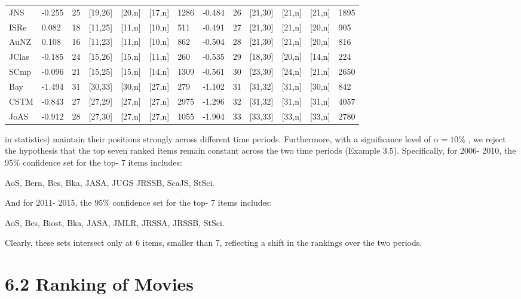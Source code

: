 \begin{longtable}[]{@{}lllllllllllll@{}}
JNS & -0.255 & 25 & {[}19,26{]} & {[}20,n{]} & {[}17,n{]} & 1286 &
-0.484 & 26 & {[}21,30{]} & {[}21,n{]} & {[}21,n{]} & 1895 \\
ISRe & 0.082 & 18 & {[}11,25{]} & {[}11,n{]} & {[}10,n{]} & 511 & -0.491
& 27 & {[}21,30{]} & {[}21,n{]} & {[}20,n{]} & 905 \\
AuNZ & 0.108 & 16 & {[}11,23{]} & {[}11,n{]} & {[}10,n{]} & 862 & -0.504
& 28 & {[}21,30{]} & {[}21,n{]} & {[}20,n{]} & 816 \\
JClas & -0.185 & 24 & {[}15,26{]} & {[}15,n{]} & {[}11,n{]} & 260 &
-0.535 & 29 & {[}18,30{]} & {[}20,n{]} & {[}14,n{]} & 224 \\
SCmp & -0.096 & 21 & {[}15,25{]} & {[}15,n{]} & {[}14,n{]} & 1309 &
-0.561 & 30 & {[}23,30{]} & {[}24,n{]} & {[}21,n{]} & 2650 \\
Bay & -1.494 & 31 & {[}30,33{]} & {[}30,n{]} & {[}27,n{]} & 279 & -1.102
& 31 & {[}31,32{]} & {[}31,n{]} & {[}30,n{]} & 842 \\
CSTM & -0.843 & 27 & {[}27,29{]} & {[}27,n{]} & {[}27,n{]} & 2975 &
-1.296 & 32 & {[}31,32{]} & {[}31,n{]} & {[}31,n{]} & 4057 \\
JoAS & -0.912 & 28 & {[}27,30{]} & {[}27,n{]} & {[}27,n{]} & 1055 &
-1.904 & 33 & {[}33,33{]} & {[}33,n{]} & {[}33,n{]} & 2780 \\
\end{longtable}

in statistics) maintain their positions strongly across different time
periods. Furthermore, with a significance level of \(\alpha = 10\%\) ,
we reject the hypothesis that the top seven ranked items remain constant
across the two time periods (Example 3.5). Specifically, for 2006- 2010,
the \(95\%\) confidence set for the top- 7 items includes:

AoS, Bern, Bcs, Bka, JASA, JUGS JRSSB, ScaJS, StSci.

And for 2011- 2015, the \(95\%\) confidence set for the top- 7 items
includes:

AoS, Bcs, Biost, Bka, JASA, JMLR, JRSSA, JRSSB, StSci.

Clearly, these sets intersect only at 6 items, smaller than 7,
reflecting a shift in the rankings over the two periods.

\section{6.2 Ranking of Movies}\label{ranking-of-movies}

